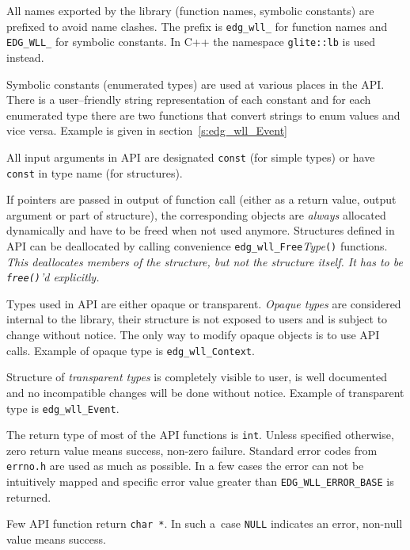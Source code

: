
%
All names exported by the \LB library (function names, symbolic
constants) are prefixed to avoid name clashes. The prefix is
\verb'edg_wll_' for function names and \verb'EDG_WLL_' for
symbolic constants. In C++ the namespace \verb'glite::lb' is used
instead.

%
Symbolic constants (\ie enumerated types) are used at various places in the \LB
API. There is a user--friendly string representation of each
constant and for each enumerated type there are two functions that
convert strings to enum values and vice versa. Example is given in
section~\ref{s:edg_wll_Event}

%
All input arguments in \LB API are designated \verb'const' (for simple
types) or have \verb'const' in type name (for structures).

If pointers are passed in output of function call (either as a return
value, output argument or part of structure), the corresponding
objects are \emph{always} allocated dynamically and have to be freed
when not used anymore. Structures defined in \LB API can be
deallocated by calling convenience
\verb'edg_wll_Free'\textit{Type}\verb'()' functions. {\it This
deallocates members of the structure, but not the structure itself. It
has to be \verb'free()''d explicitly.}

%
Types used in \LB API are either opaque or transparent. \textit{Opaque
types} are considered internal to the library, their structure is not
exposed to users and is subject to change without notice. The only way
to modify opaque objects is to use API calls. Example of opaque type
is \verb'edg_wll_Context'.

Structure of \textit{transparent types} is completely visible to
user, is well documented and no incompatible changes will be done
without notice. Example of transparent type is
\verb'edg_wll_Event'.

%
The return type of most of the API functions is \verb'int'.
Unless specified otherwise, zero return value means success, non-zero
failure. Standard error codes from \verb'errno.h' are used as
much as possible. In a few cases the error can not be intuitively
mapped and \LB specific error value greater than
\verb'EDG_WLL_ERROR_BASE' is returned.

Few API function return \verb'char *'. In such a~case
\verb'NULL' indicates an error, non-null value means success.

